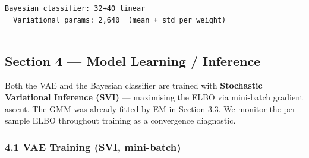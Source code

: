 \documentclass[11pt]{article}
\begin{document}
    \begin{Verbatim}[commandchars=\\\{\}]
Bayesian classifier: 32→40 linear
  Variational params: 2,640  (mean + std per weight)
    \end{Verbatim}

    \begin{center}\rule{0.5\linewidth}{0.5pt}\end{center}

\subsection{Section 4 --- Model Learning /
Inference}\label{section-4-model-learning-inference}

Both the VAE and the Bayesian classifier are trained with
\textbf{Stochastic Variational Inference (SVI)} --- maximising the ELBO
via mini-batch gradient ascent. The GMM was already fitted by EM in
Section 3.3. We monitor the per-sample ELBO throughout training as a
convergence diagnostic.

    \subsubsection{4.1 VAE Training (SVI,
mini-batch)}\label{vae-training-svi-mini-batch}
\end{document}
